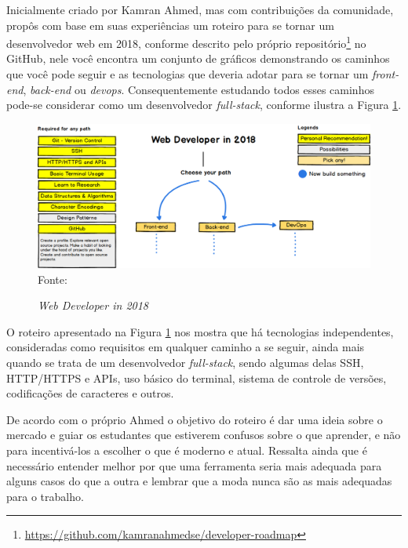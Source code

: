 \documentclass[
	12pt,				%
	openright,			%
	twoside,			%
	a4paper,			%
	english,			%
	brazil				%
	]{abntex2}
\begin{document}
Inicialmente criado por Kamran Ahmed\cite{ahmedse_roadmap}, mas com contribuições da comunidade, propôs com base em suas experiências um roteiro para se tornar um desenvolvedor web em 2018, conforme descrito pelo próprio repositório\footnote{\url{https://github.com/kamranahmedse/developer-roadmap}} no GitHub, nele você encontra um conjunto de gráficos demonstrando os caminhos que você pode seguir e as tecnologias que deveria adotar para se tornar um \textit{front-end}, \textit{back-end} ou \textit{devops}. Consequentemente estudando todos esses caminhos pode-se considerar como um desenvolvedor \textit{full-stack}, conforme ilustra a Figura \ref{fig:FullstackRoadmap}.

\begin{figure}[h]
	\centering

	\caption{\textit{Web Developer in 2018}} \label{fig:FullstackRoadmap}
    \includegraphics[scale=0.4]{fullstack-roadmap} \\
    Fonte: {\cite{ahmedse_roadmap}}

\end{figure}

O roteiro apresentado na Figura \ref{fig:FullstackRoadmap} nos mostra que há tecnologias independentes, consideradas como requisitos em qualquer caminho a se seguir, ainda mais quando se trata de um desenvolvedor \textit{full-stack}, sendo algumas delas SSH, HTTP/HTTPS e APIs, uso básico do terminal, sistema de controle de versões, codificações de caracteres e outros.

De acordo com o próprio Ahmed\cite{ahmedse_roadmap} o objetivo do roteiro é dar uma ideia sobre o mercado e guiar os estudantes que estiverem confusos sobre o que aprender, e não para incentivá-los a escolher o que é moderno e atual. Ressalta ainda que é necessário entender melhor por que uma ferramenta seria mais adequada para alguns casos do que a outra e lembrar que a moda nunca são as mais adequadas para o trabalho.
\end{document}
